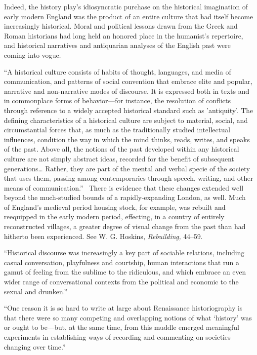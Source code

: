 Indeed, the history play's idiosyncratic purchase on the historical imagination of early modern England was the product of an entire culture that had itself become increasingly historical. Moral and political lessons drawn from the Greek and Roman historians had long held an honored place in the humanist's repertoire, and historical narratives and antiquarian analyses of the English past were coming into vogue.

``A historical culture consists of habits of thought, languages, and media of communication, and patterns of social convention that embrace elite and popular, narrative and non-narrative modes of discourse. It is expressed both in texts and in commonplace forms of behavior---for instance, the resolution of conflicts through reference to a widely accepted historical standard such as 'antiquity'. The defining characteristics of a historical culture are subject to material, social, and circumstantial forces that, as much as the traditionally studied intellectual influences, condition the way in which the mind thinks, reads, writes, and speaks of the past. Above all, the notions of the past developed within any historical culture are not simply abstract ideas, recorded for the benefit of subsequent generations… Rather, they are part of the mental and verbal specie of the society that uses them, passing among contemporaries through speech, writing, and other means of communication.''~\cite[9--10]{woolf_social_2003} There is evidence that these changes extended well beyond the much-studied bounds of a rapidly-expanding London, as well. Much of England's medieval period housing stock, for example, was rebuilt and reequipped in the early modern period, effecting, in a country of entirely reconstructed villages, a greater degree of visual change from the past than had hitherto been experienced. See W. G. Hoskins, \emph{Rebuilding,} 44--59.\nocite{hoskins_rebuilding_1953}

``Historical discourse was increasingly a key part of sociable relations, including casual conversation, playfulness and courtship, human interactions that run a gamut of feeling from the sublime to the ridiculous, and which embrace an even wider range of conversational contexts from the political and economic to the sexual and drunken.''~\cite[131]{woolf_reading}

``One reason it is so hard to write at large about Renaissance historiography is that there were so many competing and overlapping notions of what `history' was or ought to be---but, at the same time, from this muddle emerged meaningful experiments in establishing ways of recording and commenting on societies changing over time.''~\cite[95]{colie_resources_1973}

